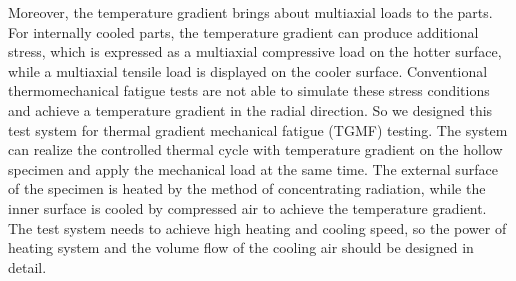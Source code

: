 Moreover, the temperature gradient brings about multiaxial loads to the parts.
For internally cooled parts, the temperature gradient can produce additional stress, which is expressed as a multiaxial compressive load on the hotter surface, while a multiaxial tensile load is displayed on the cooler surface.
Conventional thermomechanical fatigue tests are not able to simulate these stress conditions and achieve a temperature gradient in the radial direction. So we designed this test system for thermal gradient mechanical fatigue (TGMF) testing.
The system can realize the controlled thermal cycle with temperature gradient on the hollow specimen and apply the mechanical load at the same time.
The external surface of the specimen is heated by the method of concentrating radiation, while the inner surface is cooled by compressed air to achieve the temperature gradient.
The test system needs to achieve high heating and cooling speed, so the power of heating system and the volume flow of the cooling air should be designed in detail.


%

